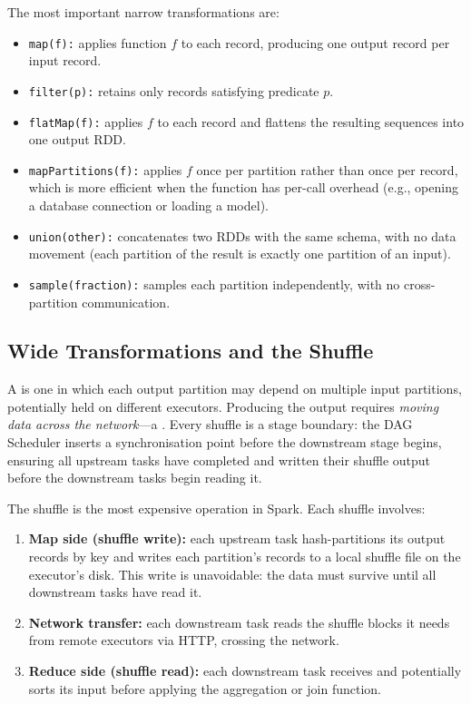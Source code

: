 The most important narrow transformations are:

\begin{itemize}
  \item \texttt{map(f):} applies function $f$ to each record, producing
        one output record per input record.
  \item \texttt{filter(p):} retains only records satisfying predicate $p$.
  \item \texttt{flatMap(f):} applies $f$ to each record and flattens the
        resulting sequences into one output RDD.
  \item \texttt{mapPartitions(f):} applies $f$ once per partition rather
        than once per record, which is more efficient when the function
        has per-call overhead (e.g., opening a database connection or
        loading a model).
  \item \texttt{union(other):} concatenates two RDDs with the same
        schema, with no data movement (each partition of the result is
        exactly one partition of an input).
  \item \texttt{sample(fraction):} samples each partition independently,
        with no cross-partition communication.
\end{itemize}

\subsection{Wide Transformations and the Shuffle}
\label{subsec:wide}

A  is one in which each output partition may
depend on multiple input partitions, potentially held on different
executors. Producing the output requires \emph{moving data across the
network}---a . Every shuffle is a stage boundary: the
DAG Scheduler inserts a synchronisation point before the downstream
stage begins, ensuring all upstream tasks have completed and written
their shuffle output before the downstream tasks begin reading it.

The shuffle is the most expensive operation in Spark. Each shuffle
involves:
\begin{enumerate}
  \item \textbf{Map side (shuffle write):} each upstream task
        hash-partitions its output records by key and writes each
        partition's records to a local shuffle file on the executor's
        disk. This write is unavoidable: the data must survive until
        all downstream tasks have read it.
  \item \textbf{Network transfer:} each downstream task reads the shuffle
        blocks it needs from remote executors via HTTP, crossing the
        network.
  \item \textbf{Reduce side (shuffle read):} each downstream task
        receives and potentially sorts its input before applying the
        aggregation or join function.
\end{enumerate}

